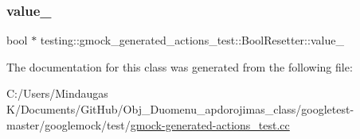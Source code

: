 \subsubsection{\texorpdfstring{value\_}{value\_}}
{\footnotesize\ttfamily bool $\ast$ testing\+::gmock\+\_\+generated\+\_\+actions\+\_\+test\+::\+Bool\+Resetter\+::value\+\_\+\hspace{0.3cm}{\ttfamily [private]}}



The documentation for this class was generated from the following file\+:\begin{DoxyCompactItemize}
\item 
C\+:/\+Users/\+Mindaugas K/\+Documents/\+Git\+Hub/\+Obj\+\_\+\+Duomenu\+\_\+apdorojimas\+\_\+class/googletest-\/master/googlemock/test/\mbox{\hyperlink{googletest-master_2googlemock_2test_2gmock-generated-actions__test_8cc}{gmock-\/generated-\/actions\+\_\+test.\+cc}}\end{DoxyCompactItemize}
